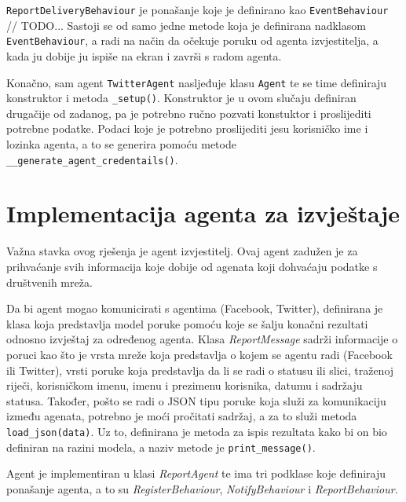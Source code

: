 \documentclass[a4paper,12pt]{foi}
\begin{document}
\texttt{ReportDeliveryBehaviour} je ponašanje koje je definirano kao \texttt{EventBehaviour} // TODO... Sastoji se od samo jedne metode koja je definirana nadklasom \texttt{EventBehaviour}, a radi na način da očekuje poruku od agenta izvjestitelja, a kada ju dobije ju ispiše na ekran i završi s radom agenta.

Konačno, sam agent \texttt{TwitterAgent} nasljeđuje klasu \texttt{Agent} te se time definiraju konstruktor i metoda \texttt{\_setup()}. Konstruktor je u ovom slučaju definiran drugačije od zadanog, pa je potrebno ručno pozvati konstuktor i proslijediti potrebne podatke. Podaci koje je potrebno proslijediti jesu korisničko ime i lozinka agenta, a to se generira pomoću metode \texttt{\_\_generate\_agent\_credentails()}.

\section{Implementacija agenta za izvještaje}

Važna stavka ovog rješenja je agent izvjestitelj. Ovaj agent zadužen je za prihvaćanje svih informacija koje dobije od agenata koji dohvaćaju podatke s društvenih mreža.

Da bi agent mogao komunicirati s agentima (Facebook, Twitter), definirana je klasa koja predstavlja model poruke pomoću koje se šalju konačni rezultati odnosno izvještaj za određenog agenta.
Klasa \textit{ReportMessage} sadrži informacije o poruci kao što je vrsta mreže koja predstavlja o kojem se agentu radi (Facebook ili Twitter), vrsti poruke koja predstavlja da li se radi o statusu ili slici, traženoj riječi, korisničkom imenu, imenu i prezimenu korisnika, datumu i sadržaju statusa.
Također, pošto se radi o JSON tipu poruke koja služi za komunikaciju između agenata, potrebno je moći pročitati sadržaj, a za to služi metoda \texttt{load\_json(data)}. Uz to, definirana je metoda za ispis rezultata kako bi on bio definiran na razini modela, a naziv metode je \texttt{print\_message()}.

\lstset{commentstyle=\textit,language=python}


Agent je implementiran u klasi \textit{ReportAgent} te ima tri podklase koje definiraju ponašanje agenta, a to su \textit{RegisterBehaviour}, \textit{NotifyBehaviour} i \textit{ReportBehaviour}.
\end{document}
